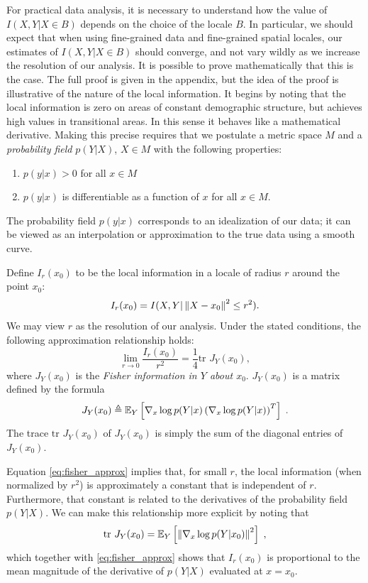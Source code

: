 \documentclass[english]{scrartcl}
\begin{document}
		For practical data analysis, it is necessary to understand how the value of $I(X,Y|X \in B)$ depends on the choice of the locale $B$. In particular, we should expect that when using fine-grained data and fine-grained spatial locales, our estimates of $I(X,Y|X \in B)$ should converge, and not vary wildly as we increase the resolution of our analysis. It is possible to prove mathematically that this is the case. The full proof is given in the appendix, but the idea of the proof is illustrative of the nature of the local information. It begins by noting that the local information is zero on areas of constant demographic structure, but achieves high values in transitional areas. In this sense it behaves like a mathematical derivative. Making this precise requires that we postulate a metric space $M$ and a \emph{probability field} $p(Y|X)$, $X \in M$ with the following properties: 
		\begin{enumerate}
		 	\item $p(y|x) > 0$ for all $x \in M$
		 	\item $p(y|x)$ is differentiable as a function of $x$ for all $x \in M$. 
		\end{enumerate}
		The probability field $p(y|x)$ corresponds to an idealization of our data; it can be viewed as an interpolation or approximation to the true data using a smooth curve. 

		Define $I_r(x_0)$ to be the local information in a locale of radius $r$ around the point $x_0$:
		\begin{equation}
			I_r(x_0) = I(X,Y| \left\lVert X - x_0\right\rVert^2 \leq r^2). 
		\end{equation}
		We may view $r$ as the resolution of our analysis. Under the stated conditions, the following approximation relationship holds: 
		\begin{equation}
			\lim_{r \rightarrow 0} \frac{I_r(x_0)}{r^2} = \frac{1}{4} \text{tr } J_Y(x_0), \label{eq:fisher_approx}
		\end{equation}
		where $J_Y(x_0)$ is the \emph{Fisher information in $Y$ about $x_0$}. $J_Y(x_0)$ is a matrix defined by the formula
		\begin{equation}
			J_Y(x_0) \triangleq \mathbb{E}_Y\left[\nabla_x \log p(Y|x) \left(\nabla_x \log p(Y|x)\right)^T \right]\;. 
		\end{equation}
		The trace $\text{tr }J_Y(x_0)$ of $J_Y(x_0)$ is simply the sum of the diagonal entries of $J_Y(x_0)$. 

		Equation \eqref{eq:fisher_approx} implies that, for small $r$, the local information (when normalized by $r^2$) is approximately a constant that is independent of $r$. Furthermore, that constant is related to the derivatives of the probability field $p(Y|X)$. We can make this relationship more explicit by noting that 
		\begin{equation}
			\text{tr }J_Y(x_0) = \mathbb{E}_Y\left[\left\lVert\nabla_x \log p(Y|x_0)\right\rVert^2\right]\;, \label{eq:derivative}
		\end{equation}
		which together with \eqref{eq:fisher_approx} shows that $I_r(x_0)$ is proportional to the mean magnitude of the derivative of $p(Y|X)$ evaluated at $x = x_0$.
\end{document}
